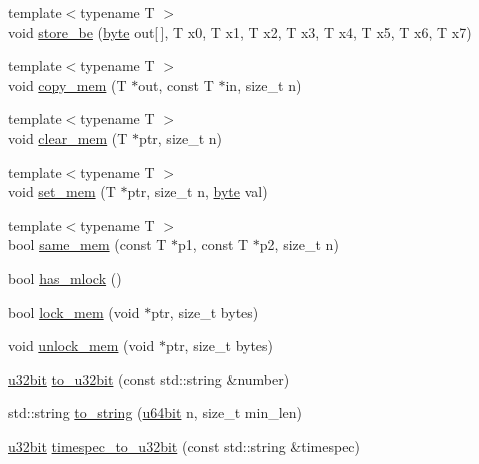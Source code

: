 \begin{DoxyCompactItemize}
\item 
{\footnotesize template$<$typename T $>$ }\\void \hyperlink{namespaceBotan_a0877deade688cbb2950662595d22546a}{store\-\_\-be} (\hyperlink{namespaceBotan_a7d793989d801281df48c6b19616b8b84}{byte} out\mbox{[}$\,$\mbox{]}, T x0, T x1, T x2, T x3, T x4, T x5, T x6, T x7)
\item 
{\footnotesize template$<$typename T $>$ }\\void \hyperlink{namespaceBotan_a81dcdaaa3ce9b5c1025d32be2594b2de}{copy\-\_\-mem} (T $\ast$out, const T $\ast$in, size\-\_\-t n)
\item 
{\footnotesize template$<$typename T $>$ }\\void \hyperlink{namespaceBotan_aeb6cf2051aa89f9d76cf4d55c126b314}{clear\-\_\-mem} (T $\ast$ptr, size\-\_\-t n)
\item 
{\footnotesize template$<$typename T $>$ }\\void \hyperlink{namespaceBotan_a6592272dc842e03d995c22c38dd76fa2}{set\-\_\-mem} (T $\ast$ptr, size\-\_\-t n, \hyperlink{namespaceBotan_a7d793989d801281df48c6b19616b8b84}{byte} val)
\item 
{\footnotesize template$<$typename T $>$ }\\bool \hyperlink{namespaceBotan_abaf9f9ec7cd1cb34fa0a9b98592fcb84}{same\-\_\-mem} (const T $\ast$p1, const T $\ast$p2, size\-\_\-t n)
\item 
bool \hyperlink{namespaceBotan_a595c90a9b73d20942b749cbf2b05f646}{has\-\_\-mlock} ()
\item 
bool \hyperlink{namespaceBotan_a87b0942a0b84d73a389a9e73ef214b94}{lock\-\_\-mem} (void $\ast$ptr, size\-\_\-t bytes)
\item 
void \hyperlink{namespaceBotan_a9d70eeecb9d768f0ec5f5ec42680ed77}{unlock\-\_\-mem} (void $\ast$ptr, size\-\_\-t bytes)
\item 
\hyperlink{namespaceBotan_aacc7d03c95e97e76168fc1c819031830}{u32bit} \hyperlink{namespaceBotan_a854758dc04b75fac8aea78d4d6da6bf9}{to\-\_\-u32bit} (const std\-::string \&number)
\item 
std\-::string \hyperlink{namespaceBotan_a6c2f353d865f4801d3c9cde2f0a34e19}{to\-\_\-string} (\hyperlink{namespaceBotan_a634063d9fb05e25262ca94ed927030f6}{u64bit} n, size\-\_\-t min\-\_\-len)
\item 
\hyperlink{namespaceBotan_aacc7d03c95e97e76168fc1c819031830}{u32bit} \hyperlink{namespaceBotan_aadecdd89accce3ce48f39f244d695cf6}{timespec\-\_\-to\-\_\-u32bit} (const std\-::string \&timespec)
\item 

\end{DoxyCompactItemize}
